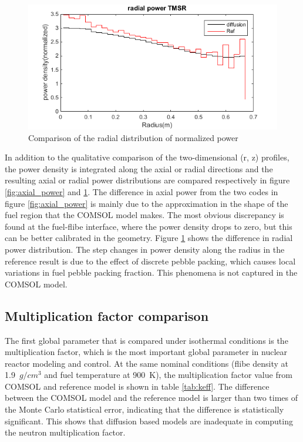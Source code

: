 \documentclass{elsarticle}
\begin{document}
\begin{figure}
  \centering
  \includegraphics[width=0.7\columnwidth]{./images/benchmark/radial_TMSR.png}
  \caption{Comparison of the radial distribution of normalized power}
  \label{fig:radial_power}
\end{figure}

In addition to the qualitative comparison of the two-dimensional (r, z) profiles, the power density is integrated along the axial or radial directions and the resulting axial or radial power distributions are compared respectively in figure \ref{fig:axial_power} and \ref{fig:radial_power}. 
The difference in axial power from the two codes in figure \ref{fig:axial_power} is mainly due to the approximation in the shape of the fuel region that the COMSOL model makes. The most obvious discrepancy is found at the fuel-flibe interface, where the power density drops to zero, but this can be better calibrated in the geometry.
Figure \ref{fig:radial_power} shows the difference in radial power distribution. The step changes in power density along the radius in the reference result is due to the effect of discrete pebble packing, which causes local variations in fuel pebble packing fraction. This phenomena is not captured in the COMSOL model.





\subsection{Multiplication factor comparison}
The first global parameter that is compared under isothermal conditions is the multiplication factor, which is the most important global parameter in nuclear reactor modeling and control. 
At the same nominal conditions (flibe density at 1.9~$g/cm^3$ and fuel temperature at 900~K), the multiplication factor value from COMSOL and reference model is shown in table \ref{tab:keff}. The difference between the COMSOL model and the reference model is larger than two times of the Monte Carlo statistical error, indicating that the difference is statistically significant. This shows that diffusion based models are inadequate in computing the neutron multiplication factor. 
\end{document}
